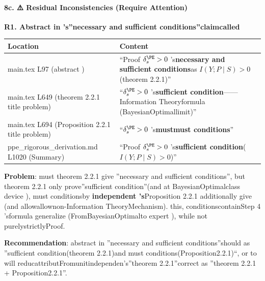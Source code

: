\documentclass[
  12pt,
]{article}
\begin{document}
\paragraph{8c. ⚠️
Residual Inconsistencies (Require Attention)}\label{c.-ux6b8bux4f59ux4e0dux4e00ux81f4ux9700ux5173ux6ce8}

\textbf{R1. Abstract in 's''necessary and sufficient conditions''claimcalled}

\begin{longtable}[]{@{}
  >{\raggedright\arraybackslash}p{}
  >{\raggedright\arraybackslash}p{}@{}}
\toprule\noalign{}
\begin{minipage}[b]{\linewidth}\raggedright
Location
\end{minipage} & \begin{minipage}[b]{\linewidth}\raggedright
Content
\end{minipage} \\
\midrule\noalign{}
\endhead
\bottomrule\noalign{}
\endlastfoot
main.tex L97 (abstract ) & ``Proof \(\delta_s^{\PE} > 0\)
's\textbf{necessary and sufficient conditions}as  \(I(Y; P \mid S) > 0\)(theorem 2.2.1)'' \\
main.tex L649 (theorem  2.2.1 title problem) & ``\(\delta_s^{\PE} > 0\)
's\textbf{sufficient condition}------Information Theoryformula (BayesianOptimallimit)'' \\
main.tex L694 (Proposition 2.2.1 title problem) & ``\(\delta_s^{\PE} > 0\)
's\textbf{mustmust conditions}'' \\
ppe\_rigorous\_derivation.md L1020 (Summary) & ``Proof
\(\delta_s^{\PE} > 0\)
's\textbf{sufficient condition}(\(I(Y; P \mid S) > 0\))'' \\
\end{longtable}

\textbf{Problem}: must theorem  2.2.1 give ''necessary and sufficient conditions'', but theorem  2.2.1
only prove''sufficient condition''(and at BayesianOptimalclass device ), must conditionsby \textbf{independent 's}Proposition
2.2.1 additionally give (and allowallownon-Information TheoryMechanism). this, conditionscontainStep 4
'sformula generalize (FromBayesianOptimalto expert ), while not purelystrictlyProof. 

\textbf{Recommendation}:
abstract in ''necessary and sufficient conditions''should as ''sufficient condition(theorem 2.2.1)and must conditions(Proposition2.2.1)``, or to will reducattributFromunitindependen's''theorem 2.2.1''correct as ''theorem 2.2.1
+ Proposition2.2.1''. 
\end{document}
